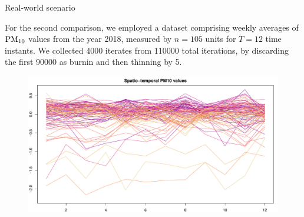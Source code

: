 \documentclass[
	11pt, %
 xcolor={dvipsnames,svgnames}
]{beamer}
\begin{document}
\begin{frame}{Real-world scenario}

For the second comparison, we employed a dataset comprising weekly averages of $\text{PM}_{10}$ values from the year 2018, measured by $n=105$ units for $T=12$ time instants. We collected 4000 iterates from 110000 total iterations, by discarding the first 90000 as burnin and then thinning by 5.
\begin{figure}[!ht]
    \centering
    \includegraphics[width=0.8\linewidth]{imgs/test_2_spatial_data.pdf}
    \label{fig:different means conceptions PM10}
\end{figure}
\end{frame}
\end{document}
